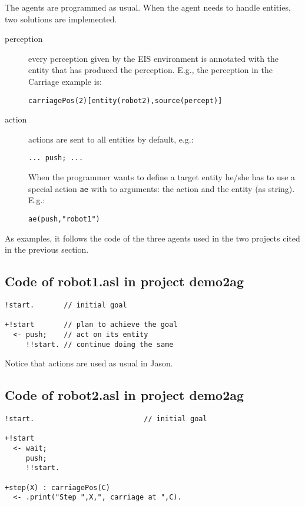 \documentclass{article}
\begin{document}
The agents are programmed as usual. When the agent needs to handle
entities, two solutions are implemented.

\begin{description}
\item[perception] every perception given by the EIS environment is
  annotated with the entity that has produced the perception. E.g.,
  the perception in the Carriage example is:
\begin{verbatim}
carriagePos(2)[entity(robot2),source(percept)]
\end{verbatim}

\item[action] actions are sent to all entities by default, e.g.:
\begin{verbatim}
... push; ...
\end{verbatim}

  When the programmer wants to define a target entity he/she has to
  use a special action \texttt{ae} with to arguments: the action and
  the entity (as string). E.g.:
\begin{verbatim}
ae(push,"robot1")
\end{verbatim}
\end{description}

As examples, it follows the code of the three agents used in the two
projects cited in the previous section.

\subsection*{Code of robot1.asl in project demo2ag}
\begin{verbatim}
!start.       // initial goal

+!start       // plan to achieve the goal 
  <- push;    // act on its entity
     !!start. // continue doing the same
\end{verbatim}
Notice that actions are used as usual in Jason.


\subsection*{Code of robot2.asl in project demo2ag}
\begin{verbatim}
!start.                          // initial goal

+!start 
  <- wait; 
     push; 
     !!start.

+step(X) : carriagePos(C) 
  <- .print("Step ",X,", carriage at ",C).
\end{verbatim}
\end{document}
